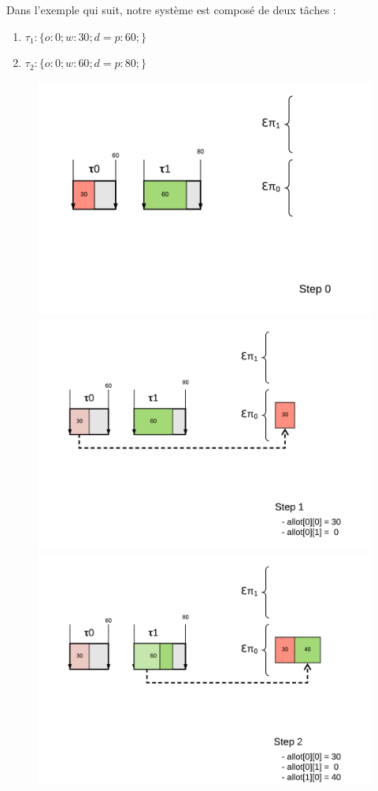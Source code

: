 	
	Dans l'exemple qui suit, notre système est composé de deux tâches :
	\begin{enumerate}
		\item $\tau_1 : \{o:0; w:30; d=p:60;\}$
		\item $\tau_2 : \{o:0; w:60; d=p:80;\}$
	\end{enumerate}
	\begin{figure}[H] 
		\includegraphics[scale=0.5]{img/uedf/uedf}
		\includegraphics[scale=0.5]{img/uedf/uedf2}
		\includegraphics[scale=0.5]{img/uedf/uedf3}

\end{figure}
